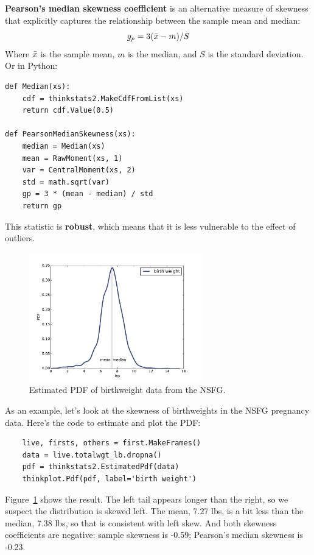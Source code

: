 \documentclass[12pt]{book}
\begin{document}
{\bf Pearson's median skewness coefficient} is an alternative measure
of skewness that explicitly captures the relationship between the
sample mean and median:
%
\[ g_p = 3 (\bar{x} - m) / S \]
%
Where $\bar{x}$ is the sample mean, $m$ is the median, and
$S$ is the standard deviation.  Or in Python:

\begin{verbatim}
def Median(xs):
    cdf = thinkstats2.MakeCdfFromList(xs)
    return cdf.Value(0.5)

def PearsonMedianSkewness(xs):
    median = Median(xs)
    mean = RawMoment(xs, 1)
    var = CentralMoment(xs, 2)
    std = math.sqrt(var)
    gp = 3 * (mean - median) / std
    return gp
\end{verbatim}

This statistic is {\bf robust}, which means that it is less vulnerable
to the effect of outliers.

\begin{figure}
\centerline{\includegraphics[height=2.2in]{figs/density_totalwgt_kde.pdf}}
\caption{Estimated PDF of birthweight data from the NSFG.}
\label{density_totalwgt_kde}
\end{figure}

As an example, let's look at the skewness of birthweights in the
NSFG pregnancy data.  Here's the code to estimate and plot the PDF:

\begin{verbatim}
    live, firsts, others = first.MakeFrames()
    data = live.totalwgt_lb.dropna()
    pdf = thinkstats2.EstimatedPdf(data)
    thinkplot.Pdf(pdf, label='birth weight')
\end{verbatim}

Figure~\ref{density_totalwgt_kde} shows the result.  The left tail appears
longer than the right, so we suspect the distribution is skewed left.
The mean, 7.27 lbs, is a bit less than
the median, 7.38 lbs, so that is consistent with left skew.
And both skewness coefficients are negative:
sample skewness is -0.59;
Pearson's median skewness is -0.23.
\end{document}
